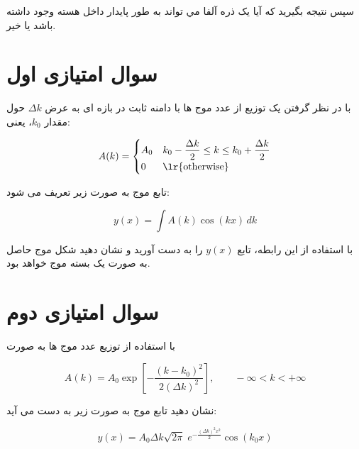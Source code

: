 \documentclass[a4paper,12pt]{article}
\begin{document}
	سپس نتيجه بگيريد که آيا يک ذره آلفا مي تواند به طور پايدار داخل هسته وجود داشته باشد يا خير.
	
\section{سوال امتیازی اول}

با در نظر گرفتن یک توزیع از عدد موج ها با دامنه ثابت در بازه ای به عرض \(\Delta k\) حول مقدار \(k_0\)، یعنی:

\[
A(k) =
\begin{cases}
	A_0 & k_0 - \dfrac{\Delta k}{2} \le k \le k_0 + \dfrac{\Delta k}{2} \\
	0 & \text{\lr{otherwise}}
\end{cases}
\]

تابع موج به صورت زیر تعریف می شود:

\[
y(x) = \int A(k)\cos(kx)\,dk
\]

با استفاده از این رابطه، تابع \(y(x)\) را به دست آورید و نشان دهید شکل موج حاصل به صورت یک بسته موج خواهد بود.

	\section{سوال امتیازی دوم}
	
	با استفاده از توزیع عدد موج ها به صورت
	
	\[
	A(k) = A_0 \exp\left[-\frac{(k-k_0)^2}{2(\Delta k)^2}\right], \qquad -\infty < k < +\infty
	\]
	
	نشان دهید تابع موج به صورت زیر به دست می آید:
	
	\[
	y(x) = A_0 \Delta k \sqrt{2\pi}\; e^{-\frac{(\Delta k)^2 x^2}{2}} \cos(k_0 x)
	\]
	

		
\end{document}
